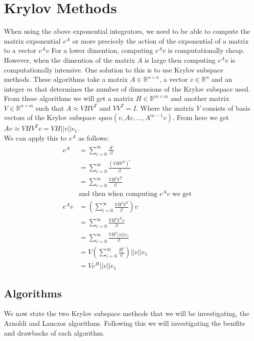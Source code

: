 \section{Krylov Methods}
When using the above exponential integrators, we need to be able to compute the matrix exponential $e^{A}$ or more precicely the action of the exponential of a matrix to a vector $e^{A}v$
For a lower dimention, computing $e^{A}v$ is computationally cheap.
However, when the dimention of the matrix $A$ is large then computing $e^{A}v$ is computationally intensive.
One solution to this is to use Krylov subspace methods.
These algorithms take a matrix $A\in \mathbb{R}^{n\times n}$, a vector $v \in \mathbb{R}^n$ and an integer $m$ that determines the number of dimensions of the Krylov subspace used.
From these algorithms we will get a matrix $H \in \mathbb{R}^{m\times m}$ and another matrix $V \in \mathbb{R}^{n\times m}$ such that $A \approx VHV^T$ and $VV^T = I$.
Where the matrix $V$ consists of basis vectors of the Krylov subspace $span(v, Av, ..., A^{m-1}v)$.
From here we get $Av \approx VHV^Tv = VH||v||e_1$.\\
We can apply this to $e^A$ as follows:
\begin{align*}
e^A &= \sum^{\infty}_{i=0}\frac{A^i}{i!}\\
&= \sum^{\infty}_{i=0}\frac{(VHV^T)^i}{i!} \\
&= \sum^{\infty}_{i=0}\frac{VH^iV^T}{i!} \\
&\text {and then when computing $e^Av$ we get}\\
e^Av &= (\sum^{\infty}_{i=0}\frac{VH^iV^T}{i!})v \\
&= \sum^{\infty}_{i=0}\frac{VH^iV^Tv}{i!} \\
&= \sum^{\infty}_{i=0}\frac{VH^i||v||e_1}{i!} \\
&= V(\sum^{\infty}_{i=0}\frac{H^i}{i!})||v||e_1 \\
&= Ve^H||v||e_1
\end{align*}

\subsection{Algorithms}
We now state the two Krylov subspace methods that we will be investigating, the Arnoldi and Lanczos algorithms.
Following this we will investigating the benifits and drawbacks of each algorithm.

